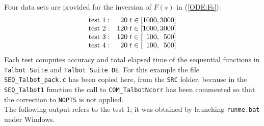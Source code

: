 \documentclass[a4paper,10pt]{report}%
\begin{document}
Four data sets are provided for the inversion of $F(s)$ in (\ref{ODE:Fs}):
\[\begin{array}{ll}
{\rm test\ 1:} & \phantom{1}20\;t\in[1000,3000] \\
{\rm test\ 2:} & 120\;t\in[1000,3000] \\
{\rm test\ 3:} & 120\;t\in[\phantom{0}100,\phantom{0}500] \\
{\rm test\ 4:} & \phantom{1}20\;t\in[\phantom{0}100,\phantom{0}500]
\end{array}\]
Each test computes accuracy and total elapsed time of the sequential functions in {\tt Talbot Suite}
and {\tt Talbot Suite DE}.
For this example the file {\tt SEQ\_Talbot\_pack.c} has been copied here, from the {\tt SRC} folder,
because in the {\tt SEQ\_Talbot1} function the call to {\tt COM\_TalbotNcorr} has been commented so that
the correction to {\tt NOPTS} is not applied.
\\
The following output refers to the test 1; it was obtained by launching {\tt runme.bat} under Windows.
\end{document}
